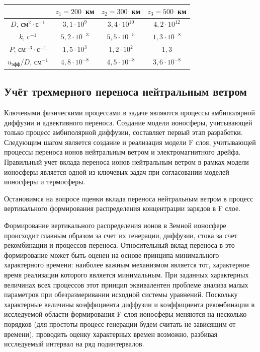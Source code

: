 \documentclass[14pt, a4paper]{extarticle}
\begin{document}
\smallskip
\begin{center}
\begin{tabular}{|c|c|c|c|}
\hline
&$z_1=200$~км&$z_2=300$~км&$z_3=500$~км\\
\hline
$D$, см$^{2}\cdot$с$^{-1}$&$3{,}1\cdot 10^9$&$3{,}4\cdot 10^{10}$&$4{,}2\cdot 10^{12}$\\
\hline
$k$, с$^{-1}$&$5{,}2\cdot 10^{-3}$&$5{,}5\cdot 10^{-5}$&$1{,}3\cdot 10^{-8}$\\
\hline
$P$, см$^{-3}\cdot$с$^{-1}$&$1{,}5\cdot 10^3$&$1{,}2\cdot 10^{2}$&$1{,}3$\\
\hline
$u_\textrm{эфф}/D$, см$^{-1}$&$4{,}8\cdot 10^{-8}$&$4{,}5\cdot 10^{-8}$&$3{,}6\cdot 10^{-8}$\\
\hline
\end{tabular}
\end{center}
\medskip 


\subsection{Учёт трехмерного переноса нейтральным ветром}

Ключевыми физическими процессами в задаче являются процессы амбиполярной диффузии и адвективного переноса. Создание модели ионосферы, учитывающей только процесс амбиполярной диффузии, составляет первый этап разработки. Следующим шагом является создание и реализация модели F слоя, учитывающей процессы переноса ионов нейтральным ветром и электромагнитного дрейфа. Правильный учет вклада переноса ионов нейтральным ветром в рамках модели ионосферы является одной из ключевых задач при согласовании моделей ионосферы и термосферы. 

Остановимся на вопросе оценки вклада переноса нейтральным ветром в процесс вертикального формирования распределения концентрации зарядов в F слое.

Формирование вертикального распределения ионов в Земной ионосфере происходит главным образом за счет их генерации, диффузии, стока за счет рекомбинации и процессов переноса. Относительный вклад переноса в это формирование может быть оценен на основе принципа минимального характерного времени: наиболее важным механизмом является тот, характерное время реализации которого является минимальным. При заданных характерных величинах всех процессов этот принцип эквивалентен проблеме анализа малых параметров при обезразмеривании исходной системы уравнений.
Поскольку характерные величины коэффициента диффузии и коэффициента рекомбинации в исследуемой области формирования F слоя ионосферы меняются на несколько порядков (для простоты процесс генерации будем считать не зависящим от времени), проводить оценку характерных времен возможно, разбивая исследуемый интервал на ряд подинтервалов.
\end{document}

